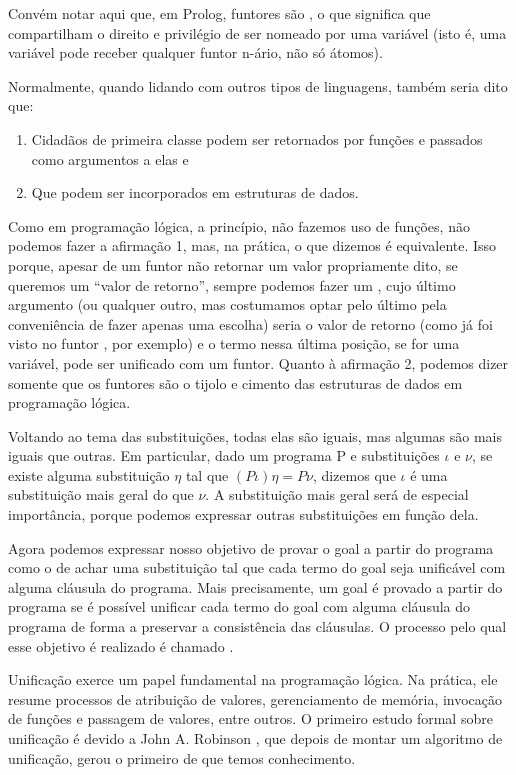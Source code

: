 \documentclass{article}
\begin{document}
  Convém notar aqui que, em Prolog, funtores são , o que significa que compartilham o
  direito e privilégio de ser nomeado por uma variável (isto é, uma variável pode receber qualquer funtor n-ário, não só átomos).

  Normalmente, quando lidando com outros tipos de linguagens, também seria dito que:

  \begin{enumerate}
    \item Cidadãos de primeira classe podem ser retornados por funções e passados como argumentos a elas e
    \item Que podem ser incorporados em estruturas de dados.
  \end{enumerate}

  Como em programação lógica, a princípio, não fazemos uso de funções, não podemos fazer a afirmação 1, mas, na prática, o que dizemos é equivalente.
  Isso porque, apesar de um funtor  não retornar um valor propriamente dito, se queremos um ``valor de retorno'', sempre podemos
  fazer um , cujo último argumento (ou qualquer outro, mas costumamos optar pelo último pela conveniência de fazer apenas uma
  escolha) seria o valor de retorno (como já foi visto no funtor , por exemplo) e o termo nessa última posição, se for uma variável, pode ser unificado com um funtor. Quanto à afirmação 2, podemos dizer somente que os funtores são o tijolo e cimento das
  estruturas de dados em programação lógica.

Voltando ao tema das substituições, todas elas são iguais, mas algumas são mais iguais que outras. Em particular, dado um programa P e substituições $\iota$ e $\nu$, se existe alguma substituição $\eta$ tal que $(P\iota)\eta = P \nu$, dizemos que $\iota$ é uma substituição mais geral do que $\nu$. A substituição mais geral será de especial importância, porque podemos expressar outras substituições em função dela.

Agora podemos expressar nosso objetivo de provar o goal a partir do programa como o de achar uma substituição tal que cada termo do goal seja unificável com alguma cláusula do programa. Mais precisamente, um goal é provado a partir do programa se é possível unificar cada termo do goal com alguma cláusula do programa de forma a preservar a consistência das cláusulas. O processo pelo qual esse objetivo é realizado é chamado .

Unificação exerce um papel fundamental na programação lógica. Na prática, ele resume processos de atribuição de valores, gerenciamento de memória, invocação de funções e passagem de valores, entre outros. O primeiro estudo formal sobre unificação é devido a John A. Robinson \cite{robinson}, que depois de montar um algoritmo de unificação, gerou o primeiro de que temos conhecimento.
\end{document}
